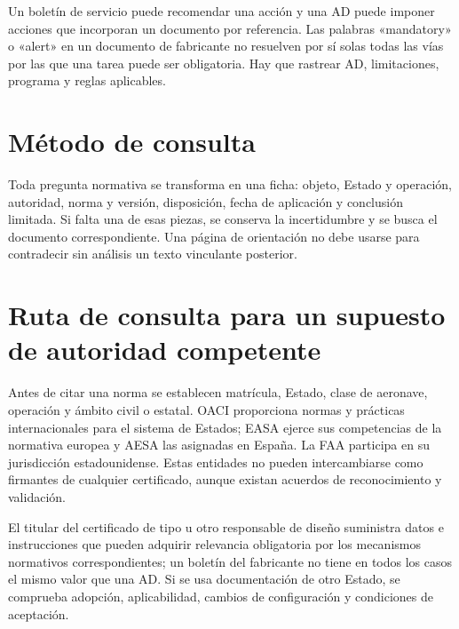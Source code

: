 Un boletín de servicio puede recomendar una acción y una AD puede imponer acciones que incorporan un documento por referencia. Las palabras «mandatory» o «alert» en un documento de fabricante no resuelven por sí solas todas las vías por las que una tarea puede ser obligatoria. Hay que rastrear AD, limitaciones, programa y reglas aplicables.
\section{Método de consulta}
Toda pregunta normativa se transforma en una ficha: objeto, Estado y operación, autoridad, norma y versión, disposición, fecha de aplicación y conclusión limitada. Si falta una de esas piezas, se conserva la incertidumbre y se busca el documento correspondiente. Una página de orientación no debe usarse para contradecir sin análisis un texto vinculante posterior.
\section{Ruta de consulta para un supuesto de autoridad competente}
Antes de citar una norma se establecen matrícula, Estado, clase de aeronave, operación y ámbito civil o estatal. OACI proporciona normas y prácticas internacionales para el sistema de Estados; EASA ejerce sus competencias de la normativa europea y AESA las asignadas en España. La FAA participa en su jurisdicción estadounidense. Estas entidades no pueden intercambiarse como firmantes de cualquier certificado, aunque existan acuerdos de reconocimiento y validación.

El titular del certificado de tipo u otro responsable de diseño suministra datos e instrucciones que pueden adquirir relevancia obligatoria por los mecanismos normativos correspondientes; un boletín del fabricante no tiene en todos los casos el mismo valor que una AD. Si se usa documentación de otro Estado, se comprueba adopción, aplicabilidad, cambios de configuración y condiciones de aceptación.


